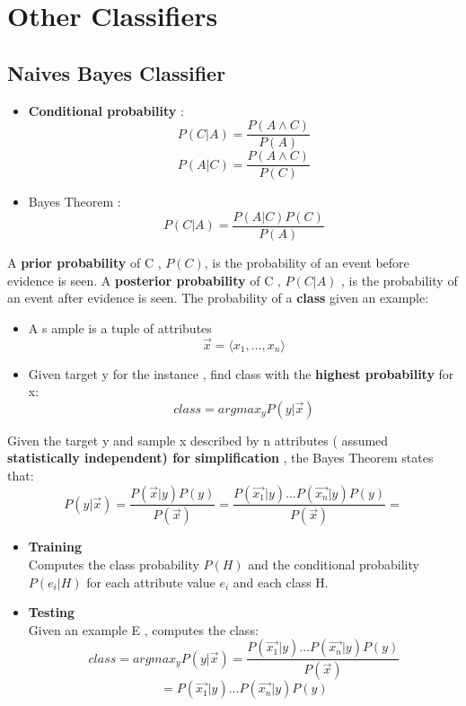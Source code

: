 \newpage
\section{Other Classifiers}

\subsection{Naives Bayes Classifier}
\begin{itemize}
\item \textbf{Conditional probability} :
$$ P(C|A) = \frac{P (A \land C)}{P(A)}$$
$$ P(A|C) = \frac{P (A \land C)}{P(C)}$$
\item Bayes Theorem : 
$$ P(C|A) = \frac{P(A|C)P(C)}{P(A)}$$
\end{itemize}
A \textbf{prior probability} of C , $P(C)$, is the probability of an event before evidence is seen.
A \textbf{posterior probability} of C , $P(C|A)$ , is the probability of an event after evidence is seen.
The probability of a \textbf{class} given an example:
\begin{itemize}
\item A s ample is a  tuple of attributes $$ \overrightarrow{x} = \langle x_1,...,x_n\rangle $$
\item Given target y for the instance , find class with the \textbf{highest probability} for x:
$$ class= arg max _y P(y| \overrightarrow{x})$$
\end{itemize}
Given the target y and sample x described by n attributes ( assumed \textbf{statistically independent) for simplification} , the Bayes Theorem states that:  
$$ P(y|\overrightarrow{x}) = \frac{P(\overrightarrow{x}|y)P(y)}{P(\overrightarrow{x})} = \frac{P(\overrightarrow{x_1}|y)...P(\overrightarrow{x_n}|y)P(y)}{P(\overrightarrow{x})} =$$
\begin{itemize}
\item \textbf{Training}\\
Computes the class probability $P(H)$  and the conditional probability $P(e_i|H)$ for each attribute value $e_i$ and each class H.
\item \textbf{Testing}\\
Given an example E , computes the class:
$$ class = argmax_y P(y|\overrightarrow{x})=\frac{P(\overrightarrow{x_1}|y)...P(\overrightarrow{x_n}|y)P(y)}{P(\overrightarrow{x})} $$
$$ = P(\overrightarrow{x_1}|y)...P(\overrightarrow{x_n}|y)P(y)$$
\end{itemize}
